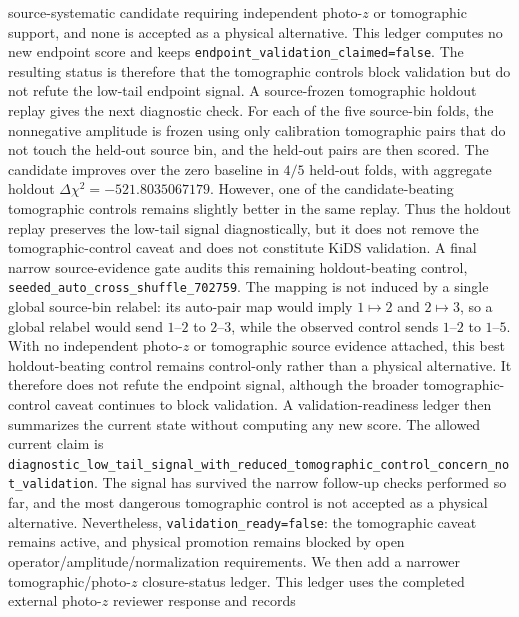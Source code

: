 \documentclass[11pt]{article}
\begin{document}
source-systematic candidate requiring independent photo-\(z\) or tomographic
support, and none is accepted as a physical alternative. This ledger computes
no new endpoint score and keeps
\texttt{endpoint\_\allowbreak{}validation\_\allowbreak{}claimed=false}. The resulting status is therefore
that the tomographic controls block validation but do not refute the low-tail
endpoint signal.
A source-frozen tomographic holdout replay gives the next diagnostic check. For
each of the five source-bin folds, the nonnegative amplitude is frozen using
only calibration tomographic pairs that do not touch the held-out source bin,
and the held-out pairs are then scored. The candidate improves over the zero
baseline in \(4/5\) held-out folds, with aggregate holdout
\(\Delta\chi^2=-521.8035067179\). However, one of the candidate-beating
tomographic controls remains slightly better in the same replay. Thus the
holdout replay preserves the low-tail signal diagnostically, but it does not
remove the tomographic-control caveat and does not constitute KiDS validation.
A final narrow source-evidence gate audits this remaining holdout-beating
control, \texttt{seeded\_\allowbreak{}auto\_\allowbreak{}cross\_\allowbreak{}shuffle\_\allowbreak{}702759}. The mapping is not
induced by a single global source-bin relabel: its auto-pair map would imply
\(1\mapsto2\) and \(2\mapsto3\), so a global relabel would send
\(1\text{--}2\) to \(2\text{--}3\), while the observed control sends
\(1\text{--}2\) to \(1\text{--}5\). With no independent photo-\(z\) or
tomographic source evidence attached, this best holdout-beating control remains
control-only rather than a physical alternative. It therefore does not refute
the endpoint signal, although the broader tomographic-control caveat continues
to block validation.
A validation-readiness ledger then summarizes the current state without
computing any new score. The allowed current claim is
\texttt{diagnostic\_\allowbreak{}low\_\allowbreak{}tail\_\allowbreak{}signal\_\allowbreak{}with\_\allowbreak{}reduced\_\allowbreak{}tomographic\_\allowbreak{}control\_\allowbreak{}concern\_\allowbreak{}not\_\allowbreak{}validation}.
The signal has survived the narrow follow-up checks performed so far, and the
most dangerous tomographic control is not accepted as a physical alternative.
Nevertheless, \texttt{validation\_\allowbreak{}ready=false}: the tomographic caveat remains
active, and physical promotion remains blocked by open
operator/amplitude/normalization requirements.
We then add a narrower tomographic/photo-\(z\) closure-status ledger. This
ledger uses the completed external photo-\(z\) reviewer response and records
\end{document}
